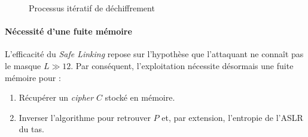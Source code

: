 \begin{figure}[H]
    \caption{Processus itératif de déchiffrement}
    \label{fig:decrypt_safelinking}
\end{figure}

\paragraph{Nécessité d'une fuite mémoire}
L'efficacité du \textit{Safe Linking} repose sur l'hypothèse que l'attaquant ne connaît pas le masque $L \gg 12$. Par conséquent, l'exploitation nécessite désormais une fuite mémoire pour :
\begin{enumerate}
    \item Récupérer un \textit{cipher} $C$ stocké en mémoire.
    \item Inverser l'algorithme pour retrouver $P$ et, par extension, l'entropie de l'ASLR du tas.
\end{enumerate}